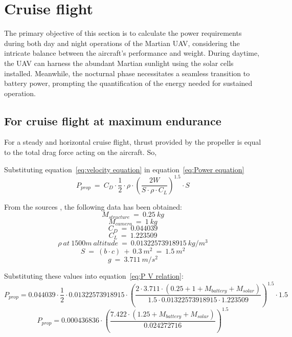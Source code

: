 
\chapter{Cruise flight}
\label{chap: Cruise Flight}

\p The primary objective of this section is to calculate the power requirements during both day and night operations of the Martian UAV, considering the intricate balance between the aircraft's performance and weight. During daytime, the UAV can harness the abundant Martian sunlight using the solar cells installed. Meanwhile, the nocturnal phase necessitates a seamless transition to battery power, prompting the quantification of the energy needed for sustained operation.

\section{For cruise flight at maximum endurance}

\p For a steady and horizontal cruise flight, thrust provided by the propeller is equal to the total drag force acting on the aircraft. So,


Substituting equation~\ref{eq:velocity equation} in equation~\ref{eq:Power equation}
\[ P_{prop} \ = \  C_D \cdot \frac{1}{2} \cdot \rho \cdot \left(\frac{2W}{S \cdot \rho \cdot C_L }\right)^{1.5} \cdot S \]


From the sources \cite{RE} \cite{Manual} \cite{enwiki:1186424503}, the following data has been obtained:
\[ M_{structure} \ = \ 0.25 \ kg \] \[ M_{camera} \ = \ 1 \ kg \]
\[ C_D \ = \ 0.044039 \] \[ C_L \ = \ 1.223509 \]
\[ \rho \ at \ 1500m \ altitude \ = \ 0.01322573918915 \ kg/m^3 \]
\[S \ = \ ( b \cdot c ) \ + \ 0.3 \ m^2 \ = \ 1.5 \ m^2\]
\[g \ = \ 3.711 \ m/s^2 \]

Substituting these values into equation~\ref{eq:P V relation}:
\[ P_{prop} = 0.044039 \cdot \frac{1}{2} \cdot 0.01322573918915 \cdot \left(\frac{2 \cdot 3.711 \cdot (0.25 + 1 + M_{battery} + M_{solar})}{1.5 \cdot 0.01322573918915 \cdot 1.223509} \right)^{1.5} \cdot 1.5 \]
\[ P_{prop} = 0.000436836 \cdot \left(\frac{7.422 \cdot (1.25 + M_{battery} + M_{solar})}{ 0.024272716 } \right)^{1.5} \]

